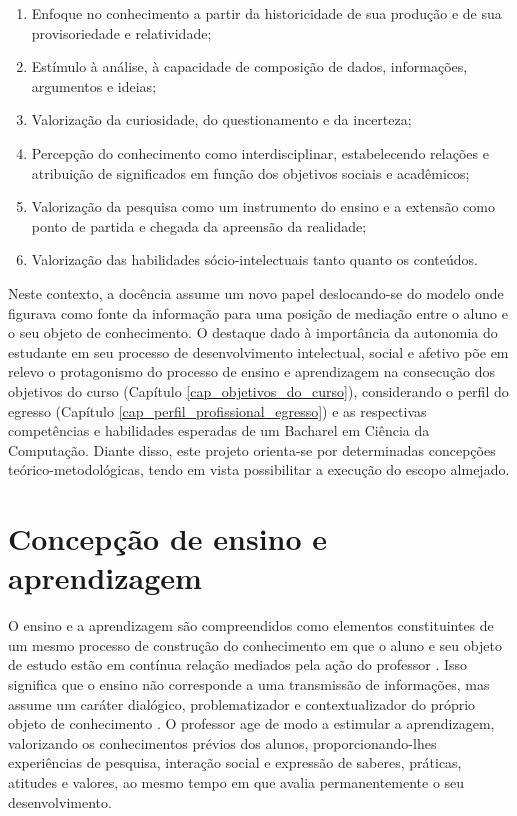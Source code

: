 \documentclass[
	12pt,				%
	openright,			%
  oneside,     %
	a4paper,			%
 hyphens,
	chapter=TITLE,		%
	english,			%
	french,				%
	spanish,			%
	brazil				%
	]{abntex2}
\begin{document}
\begin{enumerate}[label=(\alph*)]
    \item Enfoque no conhecimento a partir da historicidade de sua produção e de sua provisoriedade e relatividade;
    \item Estímulo à análise, à capacidade de composição de dados, informações, argumentos e ideias;
    \item Valorização da curiosidade, do questionamento e da incerteza;
    \item Percepção do conhecimento como interdisciplinar, estabelecendo relações e atribuição de significados em função dos objetivos sociais e acadêmicos;
    \item Valorização da pesquisa como um instrumento do ensino e a extensão como ponto de partida e chegada da apreensão da realidade;
    \item Valorização das habilidades sócio-intelectuais tanto quanto os conteúdos.
\end{enumerate}

Neste contexto, a docência assume um novo papel deslocando-se do modelo onde figurava como fonte da informação para uma posição de mediação entre o aluno e o seu objeto de conhecimento. O destaque dado à importância da autonomia do estudante em seu processo de desenvolvimento intelectual, social e afetivo põe em relevo o protagonismo do processo de ensino e aprendizagem na consecução dos objetivos do curso (Capítulo \ref{cap_objetivos_do_curso}), considerando o perfil do egresso (Capítulo \ref{cap_perfil_profissional_egresso}) e as respectivas competências e habilidades esperadas de um Bacharel em Ciência da Computação. Diante disso, este projeto orienta-se por determinadas concepções teórico-metodológicas, tendo em vista possibilitar a execução do escopo almejado.

\section{Concepção de ensino e aprendizagem}

O ensino e a aprendizagem são compreendidos como elementos constituintes de um mesmo processo de construção do conhecimento em que o aluno e seu objeto de estudo estão em contínua relação mediados pela ação do professor \cite{anastasiou2004estrategias}. Isso significa que o ensino não corresponde a uma transmissão de informações, mas assume um caráter dialógico, problematizador e contextualizador do próprio objeto de conhecimento \cite{freire2005pedagogia}. O professor age de modo a estimular a aprendizagem, valorizando os conhecimentos prévios dos alunos, proporcionando-lhes experiências de pesquisa, interação social e expressão de saberes, práticas, atitudes e valores, ao mesmo tempo em que avalia permanentemente o seu desenvolvimento.
\end{document}
